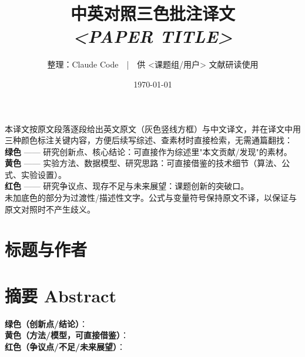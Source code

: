 \documentclass[11pt]{ctexart}
\title{\bfseries 中英对照三色批注译文\\[4pt]\large \textit{<PAPER TITLE>}}
\author{整理：Claude Code\ \ |\ \ 供 <课题组/用户> 文献研读使用}
\date{\today}
\begin{document}
\maketitle

\begin{tip}[三色批注说明]
本译文按原文段落逐段给出英文原文（灰色竖线方框）与中文译文，并在译文中用三种颜色标注关键内容，方便后续写综述、查素材时直接检索，无需通篇翻找：\\[4pt]
\colorbox{green!25}{\textbf{绿色}} —— 研究创新点、核心结论：可直接作为综述里"本文贡献/发现"的素材。\\
\colorbox{yellow!45}{\textbf{黄色}} —— 实验方法、数据模型、研究思路：可直接借鉴的技术细节（算法、公式、实验设置）。\\
\colorbox{red!20}{\textbf{红色}} —— 研究争议点、现存不足与未来展望：课题创新的突破口。\\[4pt]
未加底色的部分为过渡性/描述性文字。公式与变量符号保持原文不译，以保证与原文对照时不产生歧义。
\end{tip}


\section*{标题与作者}

\section*{摘要 Abstract}


\begin{tip}
\textbf{绿色（创新点/结论）}：\\[4pt]
\textbf{黄色（方法/模型，可直接借鉴）}：\\[4pt]
\textbf{红色（争议点/不足/未来展望）}：
\end{tip}
\end{document}
